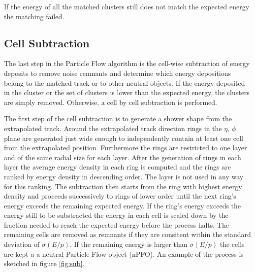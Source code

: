 If the energy of all the matched clusters still does not match the expected energy the matching failed.

\subsection{Cell Subtraction}

The last step in the Particle Flow algorithm is the cell-wise subtraction of energy deposits to remove noise remnants and determine which energy depositions belong to the matched track or to other neutral objects.
If the energy deposited in the cluster or the set of clusters is lower than the expected energy, the clusters are simply removed. Otherwise, a cell by cell subtraction is performed.

The first step of the cell subtraction is to generate a shower shape from the extrapolated track. Around the extrapolated track direction rings in the $\eta$, $\phi$ plane are generated just wide enough to independently contain at least one cell from the extrapolated position. Furthermore the rings are restricted to one layer and of the same radial size for each layer.
After the generation of rings in each layer the average energy density in each ring is computed and the rings are ranked by energy density in descending order. The layer is not used in any way for this ranking.
The subtraction then starts from the ring with highest energy density and proceeds successively to rings of lower order until the next ring's energy exceeds the remaining expected energy.
If the ring's energy exceeds the energy still to be substracted the energy in each cell is scaled down by the fraction needed to reach the expected energy before the process halts. The remaining cells are removed as remnants if they are consitent within the standard deviation of $\sigma (E/p)$. If the remaining energy is larger than $\sigma (E/p)$ the cells are kept a a neutral Particle Flow object (nPFO).
An example of the process is sketched in figure \ref{fig:sub}. 




